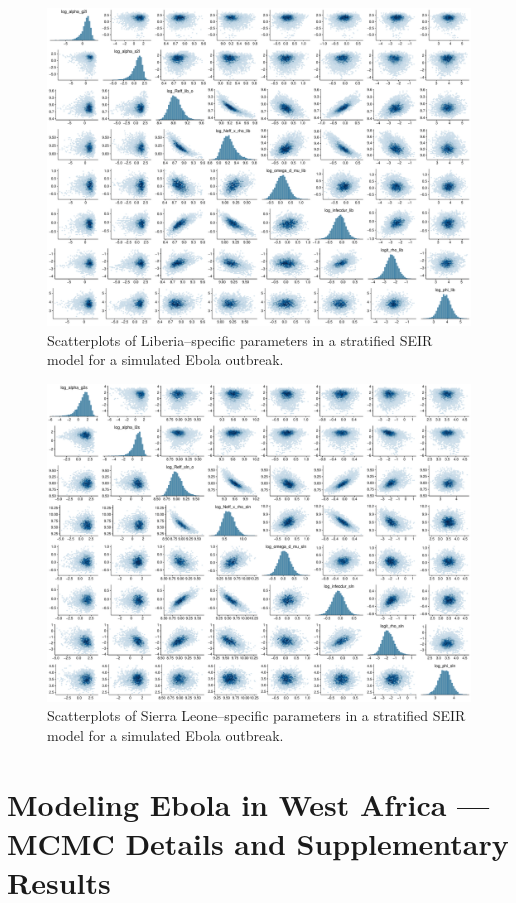 \begin{figure}[htbp]
	\centering
	\includegraphics[width=\linewidth]{figures/ebola_synth_pairs_lib}
	\caption{Scatterplots of Liberia--specific parameters in a stratified SEIR model for a simulated Ebola outbreak.}
\end{figure}

\begin{figure}[htbp]
	\centering
	\includegraphics[width=\linewidth]{figures/ebola_synth_pairs_sln}
	\caption{Scatterplots of Sierra Leone--specific parameters in a stratified SEIR model for a simulated Ebola outbreak.}
\end{figure}

\newpage
\section{Modeling Ebola in West Africa --- MCMC Details and Supplementary Results}
\label{sec:ebola_supplement}

